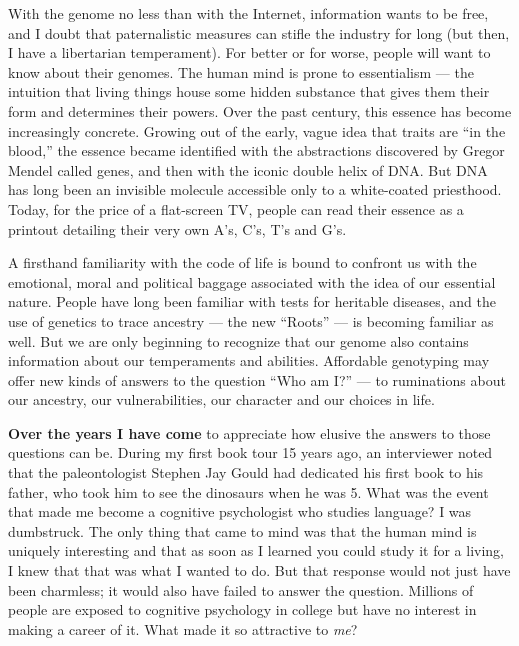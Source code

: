 With the genome no less than with the Internet, information wants to be
free, and I doubt that paternalistic measures can stifle the industry
for long (but then, I have a libertarian temperament). For better or for
worse, people will want to know about their genomes. The human mind is
prone to essentialism --- the intuition that living things house some
hidden substance that gives them their form and determines their powers.
Over the past century, this essence has become increasingly concrete.
Growing out of the early, vague idea that traits are ``in the blood,''
the essence became identified with the abstractions discovered by Gregor
Mendel called genes, and then with the iconic double helix of DNA. But
DNA has long been an invisible molecule accessible only to a
white-coated priesthood. Today, for the price of a flat-screen TV,
people can read their essence as a printout detailing their very own
A's, C's, T's and G's.

A firsthand familiarity with the code of life is bound to confront us
with the emotional, moral and political baggage associated with the idea
of our essential nature. People have long been familiar with tests for
heritable diseases, and the use of genetics to trace ancestry --- the
new ``Roots'' --- is becoming familiar as well. But we are only
beginning to recognize that our genome also contains information about
our temperaments and abilities. Affordable genotyping may offer new
kinds of answers to the question ``Who am I?'' --- to ruminations about
our ancestry, our vulnerabilities, our character and our choices in
life.

\textbf{Over the years I have come} to appreciate how elusive the
answers to those questions can be. During my first book tour 15 years
ago, an interviewer noted that the paleontologist Stephen Jay Gould had
dedicated his first book to his father, who took him to see the
dinosaurs when he was 5. What was the event that made me become a
cognitive psychologist who studies language? I was dumbstruck. The only
thing that came to mind was that the human mind is uniquely interesting
and that as soon as I learned you could study it for a living, I knew
that that was what I wanted to do. But that response would not just have
been charmless; it would also have failed to answer the question.
Millions of people are exposed to cognitive psychology in college but
have no interest in making a career of it. What made it so attractive to
\emph{me}?

